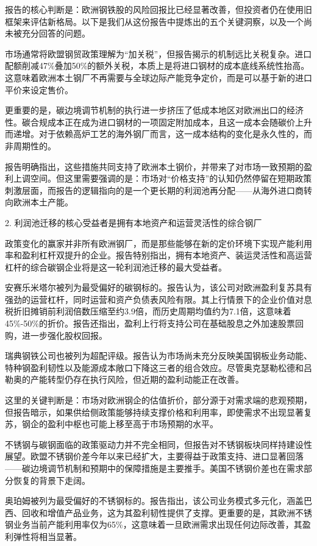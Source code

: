 \documentclass[11pt]{ctexart}
\begin{document}
报告的核心判断是：欧洲钢铁股的风险回报比已经显著改善，但投资者仍在使用旧框架来评估新格局。以下是我们从这份报告中提炼出的五个关键洞察，以及一个尚未被充分回答的问题。

市场通常将欧盟钢贸政策理解为“加关税”，但报告揭示的机制远比关税复杂。进口配额削减47\%叠加50\%的额外关税，本质上是将进口钢材的成本底线系统性抬高。这意味着欧洲本土钢厂不再需要与全球边际产能竞争定价，而是可以基于新的进口平价来设定售价。

更重要的是，碳边境调节机制的执行进一步挤压了低成本地区对欧洲出口的经济性。碳合规成本正在成为进口钢材的一项固定附加成本，且这一成本会随碳价上升而递增。对于依赖高炉工艺的海外钢厂而言，这一成本结构的变化是永久性的，而非周期性的。

报告明确指出，这些措施共同支持了欧洲本土钢价，并带来了对市场一致预期的盈利上调空间。但这里需要强调的是：市场对“价格支持”的认知仍然停留在短期政策刺激层面，而报告的逻辑指向的是一个更长期的利润池再分配——从海外进口商转向欧洲本土产能。

2. 利润池迁移的核心受益者是拥有本地资产和运营灵活性的综合钢厂

政策变化的赢家并非所有欧洲钢厂，而是那些能够在新的定价环境下实现产能利用率和盈利杠杆双提升的企业。报告特别指出，拥有本地资产、装运灵活性和高运营杠杆的综合碳钢企业将是这一轮利润池迁移的最大受益者。

安赛乐米塔尔被列为最受偏好的碳钢标的。报告认为，该公司对欧洲盈利复苏具有强劲的运营杠杆，同时运营和资产负债表风险有限。其上行情景下的企业价值对息税折旧摊销前利润倍数压缩至约3.9倍，而历史周期均值约为7.1倍，这意味着45\%-50\%的折价。报告还指出，盈利上行将支持公司在基础股息之外加速股票回购，进一步强化股权回报。

瑞典钢铁公司也被列为超配评级。报告认为市场尚未充分反映美国钢板业务动能、特种钢盈利韧性以及能源成本敞口下降这三者的组合效应。尽管奥克瑟勒松德和吕勒奥的产能转型仍存在执行风险，但近期的盈利动能正在改善。

这里的关键判断是：市场对欧洲钢企的估值折价，部分源于对需求端的悲观预期，但报告暗示，如果供给侧政策能够持续支撑价格和利用率，即使需求不出现显著复苏，钢企的盈利中枢也可能上移至高于市场预期的水平。

不锈钢与碳钢面临的政策驱动力并不完全相同，但报告对不锈钢板块同样持建设性展望。欧盟不锈钢价差今年以来已经扩大，主要得益于政策支持、进口显著回落——碳边境调节机制和预期中的保障措施是主要推手。美国不锈钢价差也在需求部分恢复的背景下走阔。

奥珀姆被列为最受偏好的不锈钢标的。报告指出，该公司业务模式多元化，涵盖巴西、回收和增值产品业务，这为其盈利韧性提供了支撑。更重要的是，其欧洲不锈钢业务当前产能利用率仅为65\%，这意味着一旦欧洲需求出现任何边际改善，其盈利弹性将相当显著。
\end{document}

